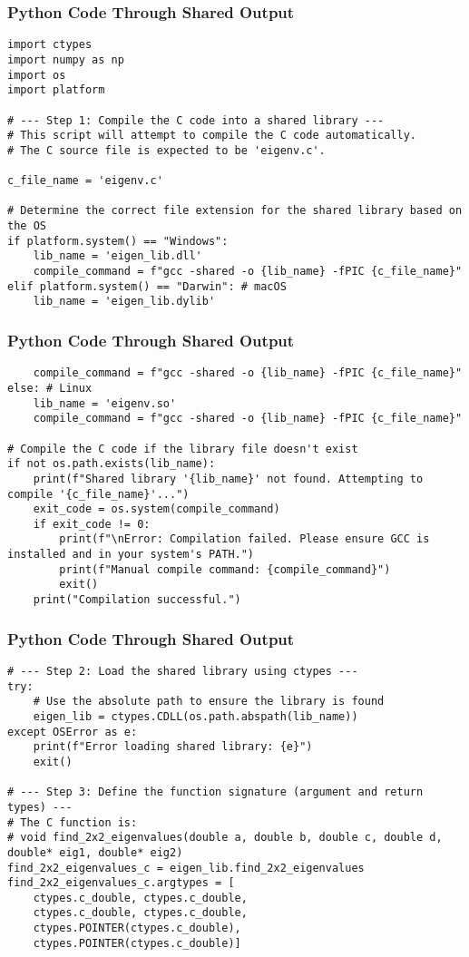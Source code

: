 \documentclass{beamer}
\begin{document}
\begin{frame}[fragile]
\frametitle{Python Code Through Shared Output }
\begin{lstlisting}
import ctypes
import numpy as np
import os
import platform

# --- Step 1: Compile the C code into a shared library ---
# This script will attempt to compile the C code automatically.
# The C source file is expected to be 'eigenv.c'.

c_file_name = 'eigenv.c'

# Determine the correct file extension for the shared library based on the OS
if platform.system() == "Windows":
    lib_name = 'eigen_lib.dll'
    compile_command = f"gcc -shared -o {lib_name} -fPIC {c_file_name}"
elif platform.system() == "Darwin": # macOS
    lib_name = 'eigen_lib.dylib'
    \end{lstlisting}    
\end{frame}
\begin{frame}[fragile]
\frametitle{Python Code Through Shared Output }
\begin{lstlisting}
    compile_command = f"gcc -shared -o {lib_name} -fPIC {c_file_name}"
else: # Linux
    lib_name = 'eigenv.so'
    compile_command = f"gcc -shared -o {lib_name} -fPIC {c_file_name}"

# Compile the C code if the library file doesn't exist
if not os.path.exists(lib_name):
    print(f"Shared library '{lib_name}' not found. Attempting to compile '{c_file_name}'...")
    exit_code = os.system(compile_command)
    if exit_code != 0:
        print(f"\nError: Compilation failed. Please ensure GCC is installed and in your system's PATH.")
        print(f"Manual compile command: {compile_command}")
        exit()
    print("Compilation successful.")
\end{lstlisting}    
\end{frame}
\begin{frame}[fragile]
\frametitle{Python Code Through Shared Output }
\begin{lstlisting}
# --- Step 2: Load the shared library using ctypes ---
try:
    # Use the absolute path to ensure the library is found
    eigen_lib = ctypes.CDLL(os.path.abspath(lib_name))
except OSError as e:
    print(f"Error loading shared library: {e}")
    exit()

# --- Step 3: Define the function signature (argument and return types) ---
# The C function is:
# void find_2x2_eigenvalues(double a, double b, double c, double d, double* eig1, double* eig2)
find_2x2_eigenvalues_c = eigen_lib.find_2x2_eigenvalues
find_2x2_eigenvalues_c.argtypes = [
    ctypes.c_double, ctypes.c_double,
    ctypes.c_double, ctypes.c_double,
    ctypes.POINTER(ctypes.c_double),
    ctypes.POINTER(ctypes.c_double)]
    \end{lstlisting}    
\end{frame}
\end{document}
